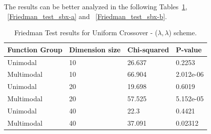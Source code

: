 The results can be better analyzed in the following Tables~\ref{Friedman_test_uniform-a}, ~\ref{Friedman_test_sbx-a} and ~\ref{Friedman_test_sbx-b}.


\begin{table}[h]
	\centering
	\begin{tabular}{|l|l|l|l|}
		\hline
		\textbf{Function Group} & \textbf{Dimension size}      & \textbf{Chi-squared}        & \textbf{P-value}                     \\ \hline
		\multicolumn{1}{|l|}{Unimodal} & \multicolumn{1}{|l|}{10} & \multicolumn{1}{l|}{26.637} & \multicolumn{1}{l|}{0.2253} \\ \hline
		\multicolumn{1}{|l|}{Multimodal} & \multicolumn{1}{|l|}{10} & \multicolumn{1}{l|}{66.904} & \multicolumn{1}{l|}{2.012e-06}  \\ \hline
		\hline
		\multicolumn{1}{|l|}{Unimodal} & \multicolumn{1}{|l|}{20} & \multicolumn{1}{l|}{19.698} & \multicolumn{1}{l|}{0.6019} \\ \hline
		\multicolumn{1}{|l|}{Multimodal} & \multicolumn{1}{|l|}{20} & \multicolumn{1}{l|}{57.525} & \multicolumn{1}{l|}{5.152e-05}  \\ \hline
		\hline	
		\multicolumn{1}{|l|}{Unimodal} & \multicolumn{1}{|l|}{40} & \multicolumn{1}{l|}{22.3} & \multicolumn{1}{l|}{0.4421} \\ \hline
		\multicolumn{1}{|l|}{Multimodal} & \multicolumn{1}{|l|}{40} & \multicolumn{1}{l|}{37.091} & \multicolumn{1}{l|}{0.02312}  \\ \hline
	\end{tabular}
	\caption{Friedman Test results for Uniform Crossover - ($\lambda, \lambda$) scheme.}
	\label{Friedman_test_uniform-a}	
\end{table}



